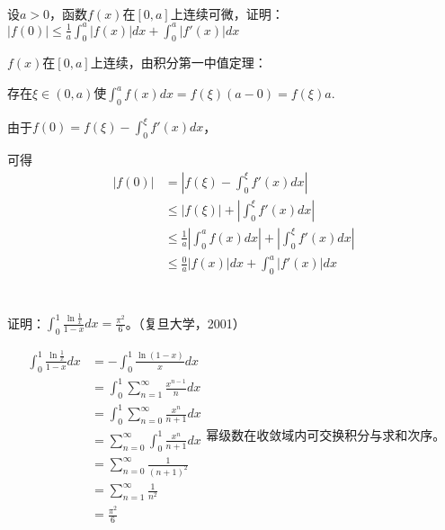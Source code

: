   
    \begin{example}
    \hfill\\
    设$a>0$，函数$f(x)$在$[0,a]$上连续可微，证明：$|f(0)|\leq\frac1a\int_0^a|f(x)|dx+\int_0^a|f'(x)|dx$
    
    
    $f(x)$在$[0,a]$上连续，由积分第一中值定理：
  
  存在$\xi\in(0,a)$使$\int_0^af(x)dx=f(\xi)(a-0)=f(\xi)a.$
  
  由于$f(0)=f(\xi)-\int_0^{\xi}f'(x)dx$，
  
  可得
  \begin{equation}
  \begin{aligned}
  |f(0)|&=|f(\xi)-\int_0^{\xi}f'(x)dx|\\
  &\leq|f(\xi)|+|\int_0^{\xi}f'(x)dx|\\
  &\leq\frac{1}{a}|\int_0^af(x)dx|+|\int_0^{\xi}f'(x)dx|\\
  &\leq\frac{0}{a}|f(x)|dx+\int_0^a|f'(x)|dx\\
  \end{aligned}
  \end{equation}
    
    \end{example}
  
  
     \begin{example}
    \hfill\\
    证明：$\int_0^1\frac{\ln\frac1x}{1-x}dx=\frac{\pi^2}6$。（复旦大学，2001）
    
    
    \begin{equation}
  \begin{aligned}
  \int_0^1\frac{\ln\frac1x}{1-x}dx&=-\int_0^1\frac{\ln(1-x)}{x}dx\\
  &=\int_0^1\sum_{n=1}^{\infty}\frac{x^{n-1}}{n}dx\\
  &=\int_0^1\sum_{n=0}^{\infty}\frac{x^n}{n+1}dx\\
  &=\sum_{n=0}^{\infty}\int_0^1\frac{x^n}{n+1}dx\\
  &=\sum_{n=0}^{\infty}\frac{1}{(n+1)^2}\\
  &=\sum_{n=1}^{\infty}\frac{1}{n^2}\\  
  &=\frac{\pi^2}6
  \end{aligned}
  幂级数在收敛域内可交换积分与求和次序。
  \end{equation}
    
    \end{example}
  
